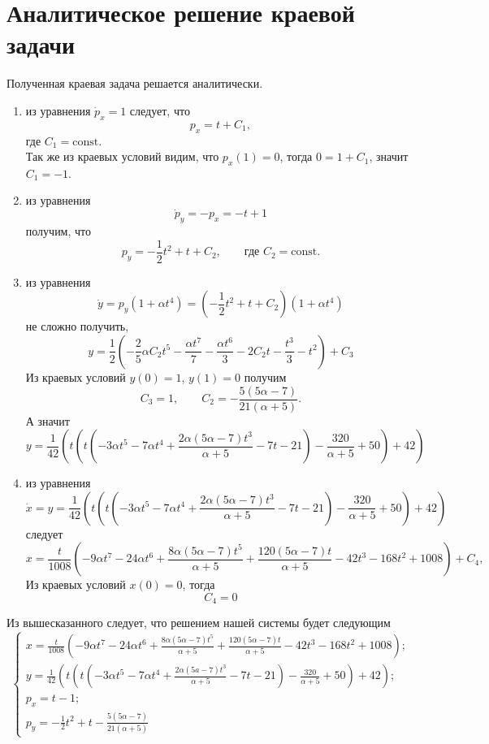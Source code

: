 \section{Аналитическое решение краевой задачи}
Полученная краевая задача решается аналитически.
\begin{enumerate}
\item из уравнения $\dot{p}_x = 1$ следует, что 
\[
p_x = t + C_1,
\] 
где $C_1 = \mathrm{const}$.\\
Так же из краевых условий видим, что $p_x(1) = 0$, тогда $0 = 1 + C_1$, значит $C_1 = -1$.
\item из уравнения 
\[
\dot{p}_y = - p_x = - t + 1
\]
 получим, что 
 \[
 p_y = -\frac{1}{2} t^2 + t + C_2,
 \qquad 
\text{где } C_2 = \mathrm{const}.
\]
\item  из уравнения 
\[
\dot{y} = p_y (1 + \alpha t^4) = (-\frac{1}{2} t^2 + t + C_2)(1 + \alpha t^4)
\]
 не сложно получить, 
\[
y = \frac{1}{2} \left(-\frac{2}{5} \alpha C_2 t^5-\frac{\alpha t^7}{7}-\frac{\alpha t^6}{3}-2 C_2 t-\frac{t^3}{3}-t^2\right)+C_3
\]
Из краевых условий $y(0) = 1$, $y(1) = 0$ получим
\[
C_3 = 1, \qquad C_2 = -\frac{5 (5 \alpha -7)}{21 (\alpha + 5)}.
\]
А значит 
\[
y = \frac{1}{42} \left(t \left(t \left(-3 \alpha t^5-7 \alpha t^4+\frac{2 \alpha(5 \alpha-7) t^3}{\alpha + 5}-7 t-21\right)-\frac{320}{\alpha + 5}+50\right)+42\right)
\]
\item из уравнения 
\[
\dot{x} = y = \frac{1}{42} \left(t \left(t \left(-3 \alpha t^5-7 \alpha t^4+\frac{2 \alpha(5 \alpha-7) t^3}{\alpha + 5}-7 t-21\right)-\frac{320}{\alpha + 5}+50\right)+42\right)
\]
следует
\[
x = \frac{t}{1008} \left(-9 \alpha t^7-24 \alpha t^6+\frac{8 \alpha (5 \alpha-7) t^5}{\alpha+5}+\frac{120 (5 \alpha-7) t}{\alpha+5}-42 t^3-168 t^2+1008\right) + C_4,
\]
Из краевых условий $x(0) = 0$, тогда
\[
C_4 = 0
\]
\end{enumerate}

Из вышесказанного следует, что решением нашей системы будет следующим
\[
	\begin{cases}
	x = \frac{t}{1008} \left(-9 \alpha t^7-24 \alpha t^6+\frac{8 \alpha (5 \alpha-7) t^5}{\alpha+5}+\frac{120 (5 \alpha-7) t}{\alpha+5}-42 t^3-168 t^2+1008\right); \\
	y = \frac{1}{42} \left(t \left(t \left(-3 \alpha t^5-7 \alpha t^4+\frac{2 \alpha(5 a-7) t^3}{\alpha + 5}-7 t-21\right)-\frac{320}{\alpha + 5}+50\right)+42\right);\\
	p_x = t - 1;\\
	p_y =  -\frac{1}{2} t^2 + t -\frac{5 (5 \alpha -7)}{21 (\alpha + 5)}
	\end{cases}
\]
